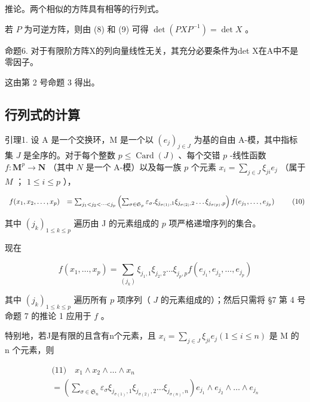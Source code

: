 推论。两个相似的方阵具有相等的行列式。

若 \(P\) 为可逆方阵，则由 (8) 和 (9) 可得 \(\det(PXP^{-1}) = \det X\) 。

命题6. 对于有限阶方阵X的列向量线性无关，其充分必要条件为det X在A中不是零因子。

这由第 2 号命题 3 得出。

\subsection{行列式的计算}

引理1. 设 A 是一个交换环，M 是一个以 \((e_j)_{j \in J}\) 为基的自由 A-模，其中指标集 \(J\) 是全序的。对于每个整数 \(p \leqslant \operatorname{Card}(J)\) 、每个交错 \(p\) -线性函数 \(f: \mathbf{M}^p \to \mathbf{N}\) （其中 \(N\) 是一个 A-模）以及每一族 \(p\) 个元素 \(x_i = \sum_{j \in J} \xi_{ji} e_j\) （属于 \(M\) ； \(1 \leqslant i \leqslant p\) ），

\[
\begin{array}{r l} f (x _ {1}, x _ {2}, \dots , x _ {p}) & = \sum_ {j _ {1} <   j _ {2} <   \dots <   j _ {p}} \left(\sum_ {\sigma \in \mathfrak {S} _ {p}} \varepsilon_ {\sigma}. \xi_ {j _ {\sigma (1)}, 1} \xi_ {j _ {\sigma (2)}, 2} \dots \xi_ {j _ {\sigma (p)}, p}\right) f (e _ {j _ {1}}, \dots , e _ {j _ {p}}) \end{array}\tag{10}
\]

其中 \((j_k)_{1\leqslant k\leqslant p}\) 遍历由 J 的元素组成的 \(p\) 项严格递增序列的集合。

现在

\[
f (x _ {1}, \dots , x _ {p}) = \sum_ {(j _ {k})} \xi_ {j _ {1}, 1} \xi_ {j _ {2}, 2} \dots \xi_ {j _ {p}, p} f (e _ {j _ {1}}, e _ {j _ {2}}, \dots , e _ {j _ {p}})
\]

其中 \((j_k)_{1 \leqslant k \leqslant p}\) 遍历所有 \(p\) 项序列（ \(J\) 的元素组成的）；然后只需将 §7 第 4 号命题 7 的推论 1 应用于 \(f\) 。

特别地，若J是有限的且含有n个元素，且 \(x_{i} = \sum_{j \in J} \xi_{ji} e_{j} (1 \leqslant i \leqslant n)\) 是 M 的 n 个元素，则

\[
\begin{array}{l} \text {(11)} \quad x _ {1} \wedge x _ {2} \wedge \dots \wedge x _ {n} \\ = \left(\sum_ {\sigma \in \mathfrak {S} _ {n}} \varepsilon_ {\sigma} \xi_ {j _ {\sigma (1)}, 1} \xi_ {j _ {\sigma (2)}, 2} \dots \xi_ {j _ {\sigma (n)}, n}\right) e _ {j _ {1}} \wedge e _ {j _ {2}} \wedge \dots \wedge e _ {j _ {n}} \end{array}
\]

